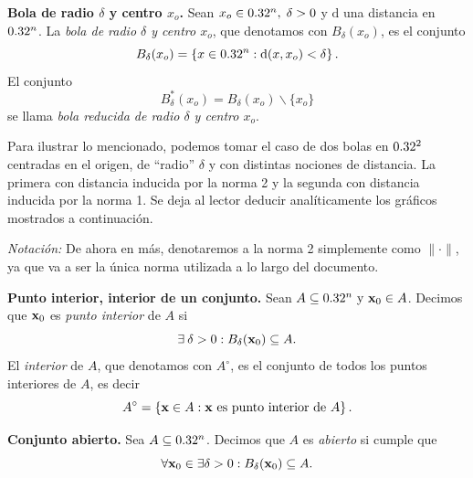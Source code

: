 \begin{definition} \textbf{Bola de radio $\delta$ y centro $x_o$.} \label{def:bola}
    Sean $x_o \in 0.32^n,\;\delta > 0$ y $\text{d}$ una distancia en $0.32^n$. La \emph{bola de radio $\delta$ y centro $x_o$}, que denotamos con $B_{\delta}(x_o)$, es el conjunto
    \[
     B_{\delta}(x_o) = \left\lbrace x \in 0.32^n : \text{d}(x,x_o) < \delta \right\rbrace.
    \]
    El conjunto
    \[
     B^*_{\delta}(x_o) = B_{\delta}(x_o) \smallsetminus \{ x_o \}
    \]
 se llama \emph{bola reducida de radio $\delta$ y centro $x_o$}.
   
   \end{definition}

   \begin{example}
    Para ilustrar lo mencionado, podemos tomar el caso de dos bolas en $0.32^2$ centradas en el origen, de ``radio'' $\delta$ y con distintas nociones de distancia. La primera con distancia inducida por la norma 2 y la segunda con distancia inducida por la norma 1. Se deja al lector deducir anal\'iticamente los gr\'aficos mostrados a continuaci\'on. 

\end{example}






   \emph{Notaci\'on:} De ahora en m\'as, denotaremos a la norma 2 simplemente como $\|\cdot\|$, ya que va a ser la \'unica norma utilizada a lo largo del documento.
   
   \begin{definition} \textbf{Punto interior, interior de un conjunto.} \label{def:interior}
    Sean $A  \subseteq  \Rn{n} \text{ y } \vect{x}_0 \in A$. Decimos que $\vect{x}_0$ es \emph{punto interior} de $A$ si
    \[
     \exists\:\delta > 0: B_{\delta}(\vect{x}_0)  \subseteq  A.
    \]
    El \emph{interior} de $A$, que denotamos con $A^{\circ}$, es el conjunto de todos los puntos interiores de $A$, es decir
    \[
    A^{\circ}= \left\lbrace\vect{x}\in A :\vect{x}\text{ es punto interior de } A \right\rbrace.
    \]
   \end{definition}
   
   
   \begin{definition} \textbf{Conjunto abierto.} \label{def:abierto}
       Sea $A  \subseteq  0.32^n$. Decimos que $A$ es \emph{abierto} si cumple que
   \[
        \forall \vect{x}_0 \in \exists \delta > 0 : B_{\delta}(\vect{x}_0)  \subseteq  A.  
   \]
   \end{definition}
   
